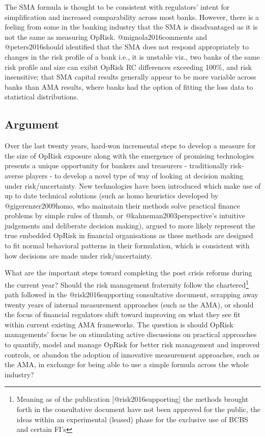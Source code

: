 \documentclass[]{article}
\let\rmarkdownfootnote\footnote%
\def\footnote{\protect\rmarkdownfootnote}
\begin{document}
The SMA formula is thought to be consistent with regulators' intent for
simplification and increased comparability across most banks. However,
there is a feeling from some in the banking industry that the SMA is
disadvantaged as it is not the same as measuring OpRisk.
@mignola2016comments and @peters2016should identified that the SMA does
not respond appropriately to changes in the risk profile of a bank i.e.,
it is unstable viz., two banks of the same risk profile and size can
exibit OpRisk RC differences exceeding 100\%, and risk insensitive; that
SMA capital results generally appear to be more variable across banks
than AMA results, where banks had the option of fitting the loss data to
statistical distributions.\medskip 

\subsection{Argument}

Over the last twenty years, hard-won incremental steps to develop a
measure for the size of OpRisk exposure along with the emergence of
promising technologies presents a unique opportunity for bankers and
treasurers - traditionally risk-averse players - to develop a novel type
of way of looking at decision making under risk/uncertainty. New
technologies have been introduced which make use of up to date technical
solutions (such as homo heuristics developed by @gigerenzer2009homo, who
mainatain their methods solve practical finance problems by simple rules
of thumb, or @kahneman2003perspective's intuitive judgements and
deliberate decision making), argued to more likely represent the true
embedded OpRisk in financial organisations as these methods are designed
to fit normal behavioral patterns in their formulation, which is
consistent with how decisions are made under risk/uncertainty.\medskip 

What are the important steps toward completing the post crisis reforms
during the current year? Should the risk management fraternity follow
the
chartered\footnote{Meaning as of the publication [@risk2016supporting] the methods brought forth in the consultative document have not been approved for the public, the ideas within an experimental (leased) phase for the exclusive use of BCBS and certain FI's}
path followed in the @risk2016supporting consultative document,
scrapping away twenty years of internal measurement approaches (such as
the AMA), or should the focus of financial regulators shift toward
improving on what they see fit within current existing AMA frameworks.
The question is should OpRisk managements' focus be on stimulating
active discussions on practical approaches to quantify, model and manage
OpRisk for better risk management and improved controls, or abandon the
adoption of innovative measurement approaches, such as the AMA, in
exchange for being able to use a simple formula across the whole
industry?\medskip 
\end{document}
